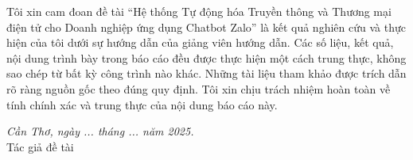 \begin{declaration}
Tôi xin cam đoan đề tài “Hệ thống Tự động hóa Truyền thông và Thương mại điện tử cho Doanh nghiệp ứng dụng Chatbot Zalo” là kết quả nghiên cứu và thực hiện của tôi dưới sự hướng dẫn của giảng viên hướng dẫn.
Các số liệu, kết quả, nội dung trình bày trong báo cáo đều được thực hiện một cách trung thực, không sao chép từ bất kỳ công trình nào khác. Những tài liệu tham khảo được trích dẫn rõ ràng nguồn gốc theo đúng quy định.
Tôi xin chịu trách nhiệm hoàn toàn về tính chính xác và trung thực của nội dung báo cáo này.


\hfill %
\begin{minipage}{0.5\textwidth}

\vspace*{1cm} %

\begin{center}
\textit{Cần Thơ, ngày ... tháng ... năm 2025.} \\
Tác giả đề tài    
\end{center}


\end{minipage}

\end{declaration}